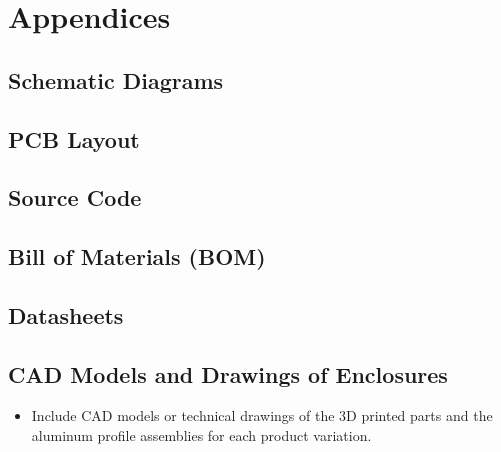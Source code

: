 \section{Appendices}
\label{sec:appendices}

\subsection{Schematic Diagrams}
\subsection{PCB Layout}
\subsection{Source Code}
\subsection{Bill of Materials (BOM)}
\subsection{Datasheets}

\subsection{CAD Models and Drawings of Enclosures}
\label{subsec:cad_models}
\begin{itemize}
	\item Include CAD models or technical drawings of the 3D printed parts and the aluminum profile assemblies for each product variation.
\end{itemize}